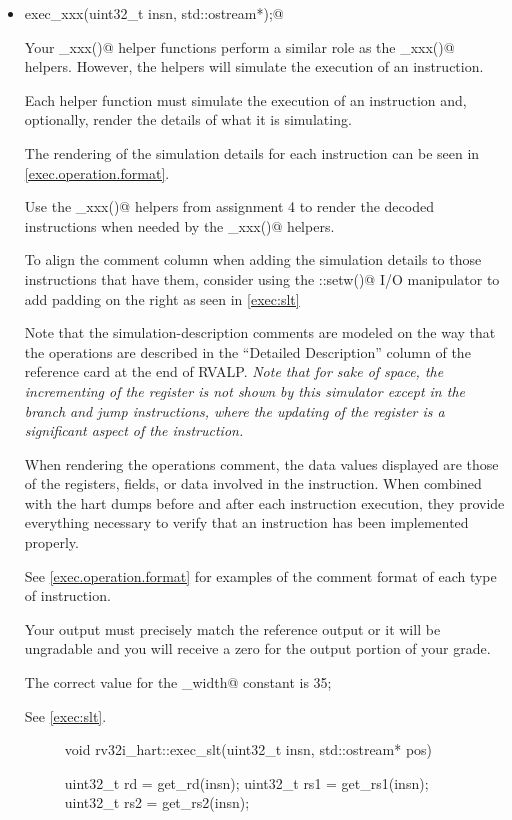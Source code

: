 \documentclass{article}
\begin{document}
\begin{itemize}
\item \verb@void exec_xxx(uint32_t insn, std::ostream*);@

Your \verb@exec_xxx()@ helper functions perform a similar role as the 
\verb@render_xxx()@ helpers.  However, the \verb@exec@ helpers will
simulate the execution of an instruction.

Each \verb@exec@ helper function must simulate the execution of an instruction and, 
optionally, render the details of what it is simulating.

The rendering of the simulation details for each instruction can be seen in 
\autoref{exec.operation.format}.

Use the \verb@render_xxx()@ helpers from assignment 4 to render the decoded 
instructions when needed by the \verb@exec_xxx()@ helpers.

To align the comment column when adding the simulation details to
those instructions that have them, 
consider using the \verb@std::setw()@ I/O manipulator to add padding 
on the right as seen in \autoref{exec:slt}

Note that the simulation-description comments are modeled on the way that
the operations are described in the ``Detailed Description'' column of the 
reference card at the end of RVALP. 
{\em Note that for sake of space, the incrementing of the \verb@pc@
register is not shown by this simulator except in the branch and jump instructions,
where the updating of the \verb@pc@ register is a significant
aspect of the instruction.}

When rendering the \verb@exec@ operations comment, the data values displayed 
are those of the registers, fields, or data involved in the instruction. 
When combined with the hart dumps before and after each instruction execution, 
they provide everything necessary to verify that an instruction 
has been implemented properly.

See \autoref{exec.operation.format} for examples of the comment format of each 
type of instruction.

Your output must precisely match the reference output or it will be 
ungradable and you will receive a zero for the output portion of your grade.

The correct value for the \verb@instruction_width@ constant is 35;

See \autoref{exec:slt}.



\begin{figure}[ht]
\begin{minipage}{\textwidth}
{\small
\begin{tty}
void rv32i_hart::exec_slt(uint32_t insn, std::ostream* pos)
{
    uint32_t rd = get_rd(insn);
    uint32_t rs1 = get_rs1(insn);
    uint32_t rs2 = get_rs2(insn);

}
\end{tty}}
\end{minipage}
\end{figure}
\end{itemize}
\end{document}
